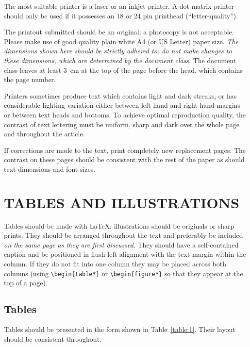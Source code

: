 \documentclass[fleqn,twoside]{article}
\begin{document}
The most suitable printer is a laser or an inkjet printer. A dot
matrix printer should only be used if it possesses an 18 or 24 pin
printhead (``letter-quality'').

The printout submitted should be an original; a photocopy is not
acceptable. Please make use of good quality plain white A4 (or US
Letter) paper size. {\em The dimensions shown here should be strictly
adhered to: do not make changes to these dimensions, which are
determined by the document class}. The document class leaves at least
3~cm at the top of the page before the head, which contains the page
number.

Printers sometimes produce text which contains light and dark streaks,
or has considerable lighting variation either between left-hand and
right-hand margins or between text heads and bottoms. To achieve
optimal reproduction quality, the contrast of text lettering must be
uniform, sharp and dark over the whole page and throughout the article.

If corrections are made to the text, print completely new replacement
pages. The contrast on these pages should be consistent with the rest
of the paper as should text dimensions and font sizes.

\section{TABLES AND ILLUSTRATIONS}

Tables should be made with \LaTeX; illustrations should be originals or
sharp prints. They should be arranged throughout the text and
preferably be included {\em on the same page as they are first
discussed}. They should have a self-contained caption and be positioned
in flush-left alignment with the text margin within the column. If they
do not fit into one column they may be placed across both columns
(using \verb-\begin{table*}- or \verb-\begin{figure*}- so that they
appear at the top of a page).

\subsection{Tables}

Tables should be presented in the form shown in
Table~\ref{table:1}.  Their layout should be consistent
throughout.
\end{document}
